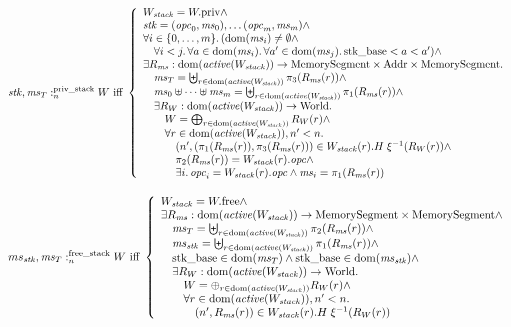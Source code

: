 \documentclass[a4paper]{article}
\begin{document}
\[
  \memSatStack{\stk,\ms_T}{W} \text{ iff } 
  \left\{
    \begin{array}{l}
      W_\var{stack} = \pwpriv \wedge \\
      \stk = (\opc_0,\ms_0), \dots (\opc_m,\ms_m) \wedge \\
      \forall i \in \{0,\dots,m\} \ldotp (\dom(\ms_i) \neq \emptyset \wedge\\
      \quad \forall i < j \ldotp \forall a \in \dom(\ms_i) \ldotp \forall a' \in \dom(\ms_j) \ldotp \stkb < a < a') \wedge\\
      \exists R_\ms : \dom(\activeReg{W_\var{stack}}) \fun \MemSeg \times \Addr \times \MemSeg \ldotp \\
      \quad \ms_T = \biguplus_{r \in \dom(\activeReg{W_\var{stack}})} \pi_3(R_\ms(r)) \wedge \\
      \quad \ms_0 \uplus \dots \uplus \ms_m = \biguplus_{r \in \dom(\activeReg{W_\var{stack}})} \pi_1(R_\ms(r)) \wedge \\
      \quad \exists R_W : \dom(\activeReg{W_\var{stack}}) \fun \World \ldotp \\
      \qquad W = \bigoplus_{r \in \dom(\activeReg{W_\var{stack}})} R_W(r) \wedge \\
      \qquad \forall r \in \dom(\activeReg{W_\var{stack}}), n' < n\ldotp \\
      \qquad \quad \npair[n']{(\pi_1(R_\ms(r)),\pi_3(R_\ms(r))} \in W_\var{stack}(r).H \; \xi^{-1}(R_W(r)) \wedge\\
      \qquad \quad \pi_2(R_\ms(r)) = W_\var{stack}(r).\opc \wedge\\
      \qquad \quad \exists i \ldotp \opc_i = W_\var{stack}(r).\opc \wedge \ms_i = \pi_1 (R_\ms(r))
    \end{array}
  \right.
\]

\[
  \memSatFStack{ms_\stk,\ms_T}{W} \text{ iff } 
  \left\{
    \begin{array}{l}
      W_\var{stack} = \pwfree \wedge \\
      \exists R_\ms : \dom(\activeReg{W_\var{stack}}) \fun \MemSeg \times \MemSeg \wedge \\
      \quad \ms_T = \biguplus_{r \in \dom(\activeReg{W_\var{stack}})} \pi_2(R_\ms(r)) \wedge \\
      \quad \ms_\stk = \biguplus_{r \in \dom(\activeReg{W_\var{stack}})} \pi_1(R_\ms(r)) \wedge \\
      \quad \stkb \in \dom(\ms_T) \wedge \stkb \in \dom(\ms_\stk) \wedge \\
      \quad \exists R_W : \dom(\activeReg{W_\var{stack}}) \fun \World\ldotp\\
      \qquad W = \oplus_{r \in \dom(\activeReg{W_\var{stack}})} R_W(r) \wedge\\
      \qquad \forall r \in \dom(\activeReg{W_\var{stack}}),n' < n \ldotp \\
      \qquad \quad \npair[n']{R_\ms(r)} \in  W_\var{stack}(r).H \; \xi^{-1}(R_W(r))
    \end{array}
  \right.
\]
\end{document}
